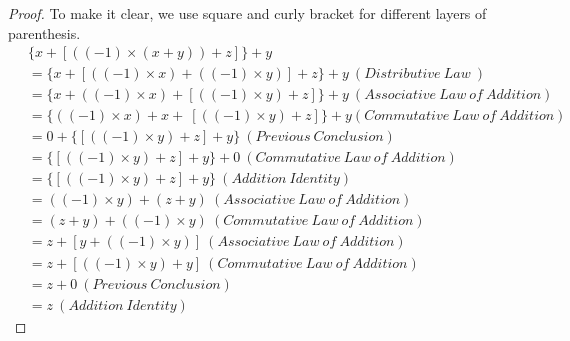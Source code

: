         \begin{proof} 
            To make it clear, we use square and curly bracket for different layers of parenthesis.
            \begin{align*}
                \  & \{x+[((-1) \times ( x+y)) +z]\} +y\\
                & =\{x+[(( -1) \times x) +(( -1) \times y)] +z\} +y\ ( Distributive\ Law\ )\\
                & =\{x+(( -1) \times x) +[(( -1) \times y) +z]\} +y\ ( Associative\ Law\ of\ Addition)\\
                & =\{(( -1) \times x) +x+\ [(( -1) \times y) +z]\} +y( Commutative\ Law\ of\ Addition)\\
                & =0+\{[(( -1) \times y) +z] +y\}\ ( Previous\ Conclusion)\\
                & =\{[(( -1) \times y) +z] +y\} +0\ ( Commutative\ Law\ of\ Addition)\\
                & =\{[(( -1) \times y) +z] +y\} \ ( Addition\ Identity)\\
                & =(( -1) \times y) +( z+y) \ ( Associative\ Law\ of\ Addition)\\
                & =( z+y) +(( -1) \times y) \ ( Commutative\ Law\ of\ Addition)\\
                & =z+[ y+(( -1) \times y)] \ ( Associative\ Law\ of\ Addition)\\
                & =z+[(( -1) \times y) +y] \ ( Commutative\ Law\ of\ Addition)\\
                & =z+0\ ( Previous\ Conclusion)\\
                & =z\ ( Addition\ Identity)
            \end{align*}
            
        \end{proof}
        
